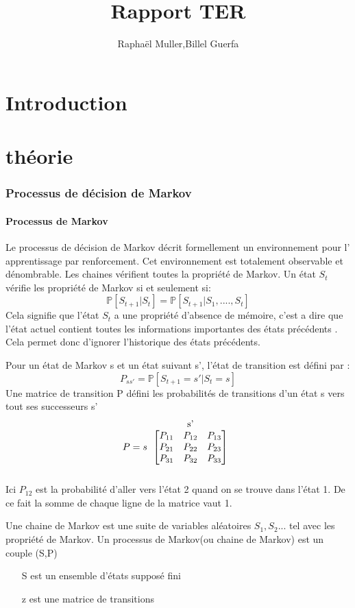 \documentclass[a4paper,10pt]{article}
\begin{document}
\title{Rapport TER}
\author{Raphaël Muller,Billel Guerfa}
\maketitle

\part{Introduction}




\part{théorie}
\section{Processus de décision de Markov}
\subsection{Processus de Markov}
Le processus de décision de Markov décrit formellement un environnement pour l' apprentissage par renforcement. Cet environnement est totalement observable et dénombrable.
Les chaines vérifient toutes la propriété de Markov. Un état $S_t$ vérifie les propriété de Markov si et seulement si:
\[\mathbb{P}[S_{t+1}|S_t]=\mathbb{P}[S_{t+1}|S_1,....,S_t]\]
Cela signifie que l'état $S_t$ a  une propriété d'absence de mémoire, c'est a dire que l'état actuel contient toutes les informations importantes des états précédents . Cela permet donc d'ignorer l'historique des états précédents.
\par
Pour un état de Markov s et un état suivant s', l'état de transition est défini par : \[P_{ss'}=\mathbb{P}[S_{t+1}=s'|S_t=s]\]
Une matrice de transition P défini les probabilités de transitions d'un état s vers tout ses successeurs s' \[P = s
\begin{tabular}{c}
 s'\\
$$$\begin{bmatrix}
P_{11} & P_{12} & P_{13} \\
P_{21} & P_{22} & P_{23} \\
P_{31} & P_{32} & P_{33}
\end{bmatrix}$$$\\
\\
\end{tabular}\]
Ici $P_{12}$ est la probabilité d'aller vers l'état 2 quand on se trouve dans l'état 1. De ce fait la somme de chaque ligne de la matrice vaut 1.\par
Une chaine de Markov est une suite de variables aléatoires $S_1,S_2$... tel avec les propriété de Markov. Un processus de Markov(ou chaine de Markov) est un couple (S,P)
\begin{itemize}
\item[S] est un ensemble d'états supposé fini
\item[z] est une matrice de transitions 
\end{itemize}
\end{document}
